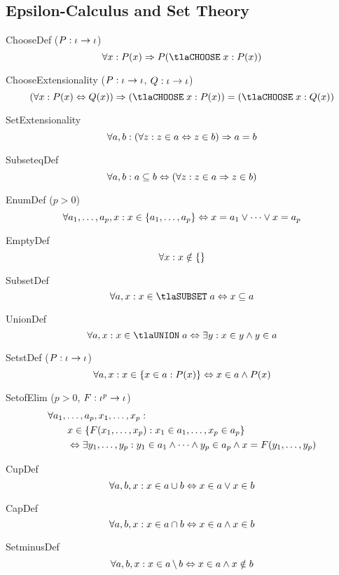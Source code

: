 \documentclass[11pt, a4paper, oneside]{article}
\begin{document}
    \subsection{Epsilon-Calculus and Set Theory}
    \label{subsec:epsilon_and_sets}

\begin{axioms}
\item[ChooseDef ($P : \iota \rightarrow \iota$)] \[
        \forall x : P(x) \imp P(\tlaCHOOSE\; x : P(x))
    \]

\item[ChooseExtensionality ($P : \iota \rightarrow \iota$, $Q : \iota \rightarrow \iota$)] \[
        (\forall x : P(x) \eqv Q(x)) \imp (\tlaCHOOSE\; x : P(x)) = (\tlaCHOOSE\; x : Q(x))
    \]

\item[SetExtensionality] \[
        \forall a, b : (\forall z : z \in a \Leftrightarrow z \in b) \Rightarrow a = b
    \]

\item[SubseteqDef] \[
        \forall a, b : a \subseteq b \Leftrightarrow (\forall z : z \in a \Rightarrow z \in b)
    \]

\item[EnumDef ($p > 0$)] \[
        \forall a_1, \dots, a_p, x : x \in \left\{  a_1, \dots, a_p  \right\} \Leftrightarrow x = a_1 \vee \dots \vee x = a_p
    \]

\item[EmptyDef] \[
        \forall x : x \notin \left\{  \right\}
    \]

\item[SubsetDef] \[
        \forall a, x : x \in \tlaSUBSET\; a \eqv x \subseteq a
    \]

\item[UnionDef] \[
        \forall a, x : x \in \tlaUNION\; a \eqv \exists y : x \in y \wedge y \in a
    \]

\item[SetstDef ($P : \iota \rightarrow \iota$)] \[
        \forall a, x : x \in \left\{  x \in a : P(x)  \right\} \Leftrightarrow x \in a \wedge P(x)
    \]

\item[SetofElim ($p > 0$, $F : \iota^p \rightarrow \iota$)] \[
        \begin{aligned}
            &\forall a_1, \dots, a_p, x_1, \dots, x_p : \\
            &\qquad x \in \left\{  F(x_1, \dots, x_p) : x_1 \in a_1, \dots, x_p \in a_p  \right\} \\
            &\qquad \Leftrightarrow \exists y_1, \dots, y_p : y_1 \in a_1 \wedge \dots \wedge y_p \in a_p \wedge x = F(y_1, \dots, y_p)
        \end{aligned}
    \]

\item[CupDef] \[
        \forall a, b, x : x \in a \cup b \Leftrightarrow x \in a \vee x \in b
    \]

\item[CapDef] \[
        \forall a, b, x : x \in a \cap b \Leftrightarrow x \in a \wedge x \in b
    \]

\item[SetminusDef] \[
        \forall a, b, x : x \in a \,\backslash\, b \Leftrightarrow x \in a \wedge x \notin b
    \]

\end{axioms}
\end{document}
